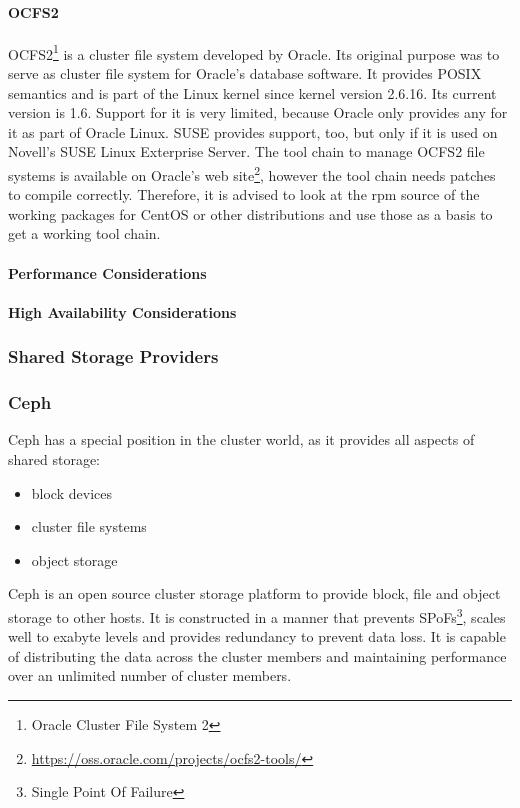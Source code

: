 \paragraph{OCFS2}
OCFS2\footnote{Oracle Cluster File System 2} is a cluster file system developed by Oracle.
Its original purpose was to serve as cluster file system for Oracle's database software.
It provides POSIX semantics and is part of the Linux kernel since kernel version 2.6.16. 
\linebreak[3]
Its current version is 1.6. Support for it is very limited, because Oracle only
provides any for it as part of Oracle Linux. SUSE provides support, too, but only
if it is used on Novell's SUSE Linux Exterprise Server. The tool chain to manage
OCFS2 file systems is available on Oracle's web site\footnote{\url{https://oss.oracle.com/projects/ocfs2-tools/}},
however the tool chain needs patches to compile correctly. Therefore, it is advised
to look at the rpm source of the working packages for CentOS or other distributions and use those as a basis
to get a working tool chain.
\paragraph{Performance Considerations}
\paragraph{High Availability Considerations}
\subsubsection{Shared Storage Providers}
\subsubsection{Ceph}
Ceph has a special position in the cluster world, as it provides all aspects of shared storage:
\begin{itemize}
\item block devices
\item cluster file systems
\item object storage
\end{itemize}

Ceph is an open source cluster storage platform to provide block, file and object storage to other hosts. It is constructed in a manner that prevents SPoFs\footnote{Single Point Of Failure}, scales well to exabyte levels and provides redundancy to prevent data loss. It is capable of distributing the data across the cluster members and maintaining performance over an unlimited number of cluster members.

